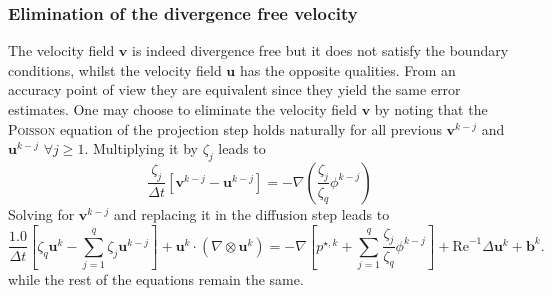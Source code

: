 \documentclass[]{scrartcl}
\begin{document}
\subsubsection{Elimination of the divergence free velocity}
The velocity field $\mathbf{v}$ is indeed divergence free but it does not satisfy the boundary conditions, whilst the velocity field $\mathbf{u}$ has the opposite qualities. From an accuracy point of view they are equivalent since they yield the same error estimates. One may choose to eliminate the velocity field $\mathbf{v}$ by noting that the \textsc{Poisson} equation of the projection step holds naturally for all previous $\mathbf{v}^{k-j}$ and $\mathbf{u}^{k-j}$ $\forall j\ge 1$. Multiplying it by $\zeta_j$ leads to
\begin{equation*}
	\dfrac{\zeta_j}{\Delta t} \left[\mathbf{v}^{k-j} - \mathbf{u}^{k-j} \right] = -\nabla \left(\dfrac{\zeta_j}{\zeta_q}\phi^{k-j}\right)
\end{equation*}
Solving for $\mathbf{v}^{k-j}$ and replacing it in the diffusion step leads to
\begin{equation*}
		\dfrac{1.0}{\Delta t} \left[\zeta_q \mathbf{u}^{k} - \sum_{j=1}^{q} \zeta_j \mathbf{u}^{k-j}\right]  + \mathbf{u}^{k} \cdot (\nabla \otimes \mathbf{u}^{k}) = -\nabla	\left[p^{\star, k} + \sum_{j=1}^{q} \dfrac{\zeta_j}{\zeta_q}\phi^{k-j} \right] +  \mathrm{Re}^{-1} \Delta \mathbf{u}^{k} + \mathbf{b}^{k}.
\end{equation*}
while the rest of the equations remain the same.
\end{document}
